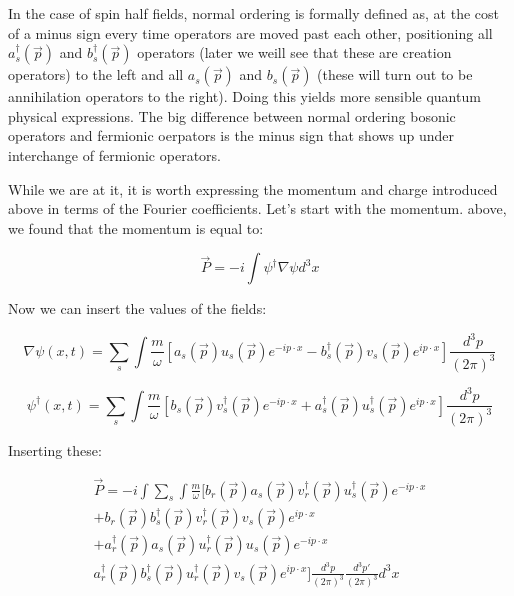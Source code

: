 \documentclass[a4]{article}
\begin{document}
    In the case of spin half fields, normal ordering is formally defined as, at the cost of a minus sign every time operators are moved past each other, positioning all
    $a_s^{\dagger} (\vec{p})$ and $b_s^{\dagger} (\vec{p})$ operators (later we weill see that these are creation operators) to the left and all $a_s (\vec{p})$ and
    $b_s (\vec{p})$ (these will turn out to be annihilation operators to the right). Doing this yields more sensible quantum physical expressions. The big difference
    between normal ordering bosonic operators and fermionic oerpators is the minus sign that shows up under interchange of fermionic operators.

    While we are at it, it is worth expressing the momentum and charge introduced above in terms of the Fourier coefficients. Let's start with the momentum. above, we found
    that the momentum is equal to:

    \begin{equation}
        \vec{P} = - i \int \psi^{\dagger} \nabla \psi d^3 x
    \end{equation}

    Now we can insert the values of the fields:

    \begin{equation}
        \nabla \psi (x, t) = \sum_{s} \int \frac{m}{\omega} [a_s (\vec{p}) u_s (\vec{p}) e^{- i p \cdot x} - b_s^{\dagger} (\vec{p}) v_s (\vec{p}) e^{i p \cdot x}] \frac{d^{3} p}{(2 \pi)^3}
    \end{equation}

    \begin{equation}
        \psi^{\dagger} (x, t) = \sum_{s} \int \frac{m}{\omega} [b_s (\vec{p}) v_s^{\dagger} (\vec{p}) e^{- i p \cdot x} + a_s^{\dagger} (\vec{p}) u_s^{\dagger} (\vec{p}) e^{i p \cdot x}] \frac{d^{3} p}{(2 \pi)^3}
    \end{equation}

    Inserting these:

    \begin{equation}
        \begin{aligned}
            \vec{P} = - i \int \sum_{s} \int \frac{m}{\omega} [b_r (\vec{p}) a_s (\vec{p}) v_r^{\dagger} (\vec{p}) u_s^{\dagger} (\vec{p}) e^{- i p \cdot x} \\
            + b_r (\vec{p}) b_s^{\dagger} (\vec{p}) v_r^{\dagger} (\vec{p}) v_s (\vec{p}) e^{i p \cdot x} \\
            + a_r^{\dagger} (\vec{p}) a_s (\vec{p}) u_r^{\dagger} (\vec{p}) u_s (\vec{p}) e^{- i p \cdot x} \\
            a_r^{\dagger} (\vec{p}) b_s^{\dagger} (\vec{p}) u_r^{\dagger} (\vec{p}) v_s (\vec{p}) e^{i p \cdot x}] \frac{d^{3} p}{(2 \pi)^3} \frac{d^{3} p'}{(2 \pi)^3} d^3 x
        \end{aligned}
    \end{equation}
\end{document}

